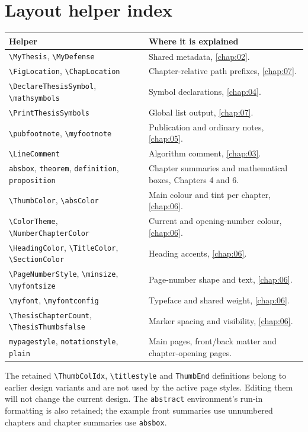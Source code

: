 \section*{Layout helper index}
\begin{longtable}{@{}p{}p{}@{}}
\toprule Helper & Where it is explained\\\midrule\endhead
\verb|\MyThesis|, \verb|\MyDefense| & Shared metadata, \autoref{chap:02}.\\
\verb|\FigLocation|, \verb|\ChapLocation| & Chapter-relative path prefixes, \autoref{chap:07}.\\
\verb|\DeclareThesisSymbol|, \verb|\mathsymbols| & Symbol declarations, \autoref{chap:04}.\\
\verb|\PrintThesisSymbols| & Global list output, \autoref{chap:07}.\\
\verb|\pubfootnote|, \verb|\myfootnote| & Publication and ordinary notes, \autoref{chap:05}.\\
\verb|\LineComment| & Algorithm comment, \autoref{chap:03}.\\
\texttt{absbox}, \texttt{theorem}, \texttt{definition}, \texttt{proposition} & Chapter summaries and mathematical boxes, Chapters 4 and 6.\\
\verb|\ThumbColor|, \verb|\absColor| & Main colour and tint per chapter, \autoref{chap:06}.\\
\verb|\ColorTheme|, \verb|\NumberChapterColor| & Current and opening-number colour, \autoref{chap:06}.\\
\verb|\HeadingColor|, \verb|\TitleColor|, \verb|\SectionColor| & Heading accents, \autoref{chap:06}.\\
\verb|\PageNumberStyle|, \verb|\minsize|, \verb|\myfontsize| & Page-number shape and text, \autoref{chap:06}.\\
\verb|\myfont|, \verb|\myfontconfig| & Typeface and shared weight, \autoref{chap:06}.\\
\verb|\ThesisChapterCount|, \verb|\ThesisThumbsfalse| & Marker spacing and visibility, \autoref{chap:06}.\\
\texttt{mypagestyle}, \texttt{notationstyle}, \texttt{plain} & Main pages, front/back matter and chapter-opening pages.\\
\bottomrule
\end{longtable}
The retained \verb|\ThumbColIdx|, \verb|\titlestyle| and \texttt{ThumbEnd}
definitions belong to earlier design variants and are not used by the active
page styles. Editing them will not change the current design. The
\texttt{abstract} environment's run-in formatting is also retained; the example
front summaries use unnumbered chapters and chapter summaries use \texttt{absbox}.
